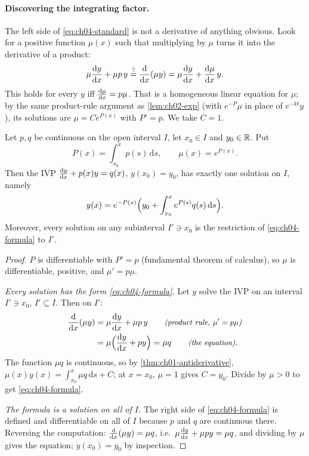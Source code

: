\paragraph{Discovering the integrating factor.} The left side of
\eqref{eq:ch04-standard} is not a derivative of anything obvious. Look for a
positive function $\mu(x)$ such that multiplying by $\mu$ turns it into the
derivative of a product:
\[
  \mu\frac{\mathrm{d}y}{\mathrm{d}x} + \mu p\,y \overset{?}{=} \frac{\mathrm{d}}{\mathrm{d}x}(\mu y) = \mu\frac{\mathrm{d}y}{\mathrm{d}x} + \frac{\mathrm{d}\mu}{\mathrm{d}x}\,y .
\]
This holds for every $y$ iff $\frac{\mathrm{d}\mu}{\mathrm{d}x} = p\mu$. That is a homogeneous linear
equation for $\mu$; by the same product-rule argument as
\cref{lem:ch02-exp} (with $e^{-P}\mu$ in place of $e^{-kt}y$), its solutions are
$\mu = Ce^{P(x)}$ with $P' = p$. We take $C = 1$.

\begin{theorem}\label{thm:ch04-main}
Let $p, q$ be continuous on the open interval $I$, let $x_0\in I$ and
$y_0\in\mathbb{R}$. Put
\[
  P(x) = \int_{x_0}^{x}p(s)\,\mathrm{d}s,\qquad \mu(x) = e^{P(x)} .
\]
Then the IVP $\frac{\mathrm{d}y}{\mathrm{d}x} + p(x)y = q(x)$, $y(x_0) = y_0$, has exactly one
solution on $I$, namely
\begin{equation}\label{eq:ch04-formula}
  y(x) = e^{-P(x)}\Bigl(y_0 + \int_{x_0}^{x}e^{P(s)}q(s)\,\mathrm{d}s\Bigr).
\end{equation}
Moreover, every solution on any subinterval $I'\ni x_0$ is the restriction of
\eqref{eq:ch04-formula} to $I'$.
\end{theorem}

\begin{proof}
$P$ is differentiable with $P' = p$ (fundamental theorem of calculus), so
$\mu$ is differentiable, positive, and $\mu' = p\mu$.

\emph{Every solution has the form \eqref{eq:ch04-formula}.} Let $y$ solve the
IVP on an interval $I'\ni x_0$, $I'\subseteq I$. Then on $I'$:
\begin{align*}
  \frac{\mathrm{d}}{\mathrm{d}x}(\mu y) &= \mu\frac{\mathrm{d}y}{\mathrm{d}x} + \mu p\,y \qquad\text{\small\itshape(product rule, $\mu' = p\mu$)}\\
  &= \mu\Bigl(\frac{\mathrm{d}y}{\mathrm{d}x} + py\Bigr) = \mu q \qquad\text{\small\itshape(the equation)}.
\end{align*}
The function $\mu q$ is continuous, so by \cref{thm:ch01-antiderivative},
$\mu(x)y(x) = \int_{x_0}^x\mu q\,\mathrm{d}s + C$; at $x = x_0$, $\mu = 1$ gives
$C = y_0$. Divide by $\mu>0$ to get \eqref{eq:ch04-formula}.

\emph{The formula is a solution on all of $I$.} The right side of
\eqref{eq:ch04-formula} is defined and differentiable on all of $I$ because
$p$ and $q$ are continuous there. Reversing the computation:
$\frac{\mathrm{d}}{\mathrm{d}x}(\mu y) = \mu q$, i.e.\ $\mu\frac{\mathrm{d}y}{\mathrm{d}x} + \mu p y = \mu q$, and dividing by
$\mu$ gives the equation; $y(x_0) = y_0$ by inspection.
\end{proof}

